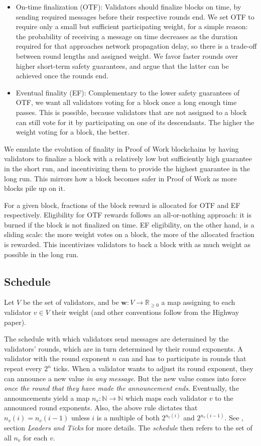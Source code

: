 \documentclass[12pt]{article}
\begin{document}
\begin{itemize}
\item
  On-time finalization (OTF): Validators should finalize blocks on time, by sending required messages before their respective rounds end. We set OTF to require only a small but sufficient participating weight, for a simple reason: the probability of receiving a message on time decreases as the duration required for that approaches network propagation delay, so there is a trade-off between round lengths and assigned weight. We favor faster rounds over higher short-term safety guarantees, and argue that the latter can be achieved once the rounds end.
\item Eventual finality (EF): Complementary to the lower safety guarantees of OTF, we want all validators voting for a block once a long enough time passes. This is possible, because validators that are not assigned to a block can still vote for it by participating on one of its descendants. The higher the weight voting for a block, the better.
\end{itemize}

We emulate the evolution of finality in Proof of Work blockchains by having validators to finalize a block with a relatively low but sufficiently high guarantee in the short run, and incentivizing them to provide the highest guarantee in the long run. This mirrors how a block becomes safer in Proof of Work as more blocks pile up on it.

For a given block, fractions of the block reward is allocated for OTF and EF respectively. Eligibility for OTF rewards follows an all-or-nothing approach: it is burned if the block is not finalized on time. EF eligibility, on the other hand, is a sliding scale: the more weight votes on a block, the more of the allocated fraction is rewarded. This incentivizes validators to back a block with as much weight as possible in the long run.

\subsection{Schedule}
\label{schedule}

Let $V$ be the set of validators, and be $\boldsymbol{w}:V\to \mathbb{R}_{\geq 0}$ a map assigning to each validator $v\in V$ their weight (and other conventions follow from the Highway paper).

The schedule with which validators send messages are determined by the validators' rounds, which are in turn determined by their round exponents. A validator with the round exponent $n$ can and has to participate in rounds that repeat every $2^n$ ticks. When a validator wants to adjust its round exponent, they can announce a new value \emph{in any message}. But the new value comes into force \emph{once the round that they have made the announcement ends}. Eventually, the announcements yield a map $n_v: \mathbb{N}\to \mathbb{N}$ which maps each validator $v$ to the announced round exponents. Also, the above rule dictates that $n_v(i)=n_v(i-1)$ unless $i$ is a multiple of both $2^{n_v(i)}$ and $2^{n_v(i-1)}$. See \cite{kane2019casperlabs}, section \emph{Leaders and Ticks} for more details. The \emph{schedule} then refers to the set of all $n_v$ for each $v$.
\end{document}
